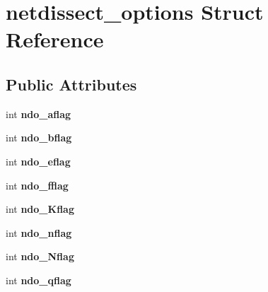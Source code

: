 \hypertarget{structnetdissect__options}{
\section{netdissect\_\-options Struct Reference}
\label{structnetdissect__options}
}
\subsection*{Public Attributes}
\begin{DoxyCompactItemize}
\item 
\hypertarget{structnetdissect__options_a04f31fae8117530bb199b55f92d9d6b0}{
int {\bfseries ndo\_\-aflag}}
\label{structnetdissect__options_a04f31fae8117530bb199b55f92d9d6b0}

\item 
\hypertarget{structnetdissect__options_aa0ffc331c898af1adb5f7e779694a3c6}{
int {\bfseries ndo\_\-bflag}}
\label{structnetdissect__options_aa0ffc331c898af1adb5f7e779694a3c6}

\item 
\hypertarget{structnetdissect__options_a04eb8e6ec0f5048c48bbc2238f35cf2a}{
int {\bfseries ndo\_\-eflag}}
\label{structnetdissect__options_a04eb8e6ec0f5048c48bbc2238f35cf2a}

\item 
\hypertarget{structnetdissect__options_a9245bc4dca5b91af6f8a83696ee7e547}{
int {\bfseries ndo\_\-fflag}}
\label{structnetdissect__options_a9245bc4dca5b91af6f8a83696ee7e547}

\item 
\hypertarget{structnetdissect__options_afdfa3be4b7103ac3a80bee375b5e1812}{
int {\bfseries ndo\_\-Kflag}}
\label{structnetdissect__options_afdfa3be4b7103ac3a80bee375b5e1812}

\item 
\hypertarget{structnetdissect__options_ad7f429a7cf4f1ebf405c526b1a217a52}{
int {\bfseries ndo\_\-nflag}}
\label{structnetdissect__options_ad7f429a7cf4f1ebf405c526b1a217a52}

\item 
\hypertarget{structnetdissect__options_a6120ca4e1c8d5e49cedf7865a0901322}{
int {\bfseries ndo\_\-Nflag}}
\label{structnetdissect__options_a6120ca4e1c8d5e49cedf7865a0901322}

\item 
\hypertarget{structnetdissect__options_a62952bf415a78f176090aa3c00bb25f6}{
int {\bfseries ndo\_\-qflag}}
\label{structnetdissect__options_a62952bf415a78f176090aa3c00bb25f6}


\end{DoxyCompactItemize}
